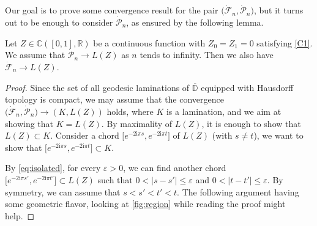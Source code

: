 \documentclass[10pt]{amsart}
\theoremstyle{definition}\newtheorem{defi}[theo]{Definition}\newtheorem{rema}[theo]{Remark}\newtheorem{exam}[theo]{Example}\newtheorem{exem}[theo]{Example}\newtheorem{nota}[theo]{Notation}
\newcommand{\R}{\mathbb{R}}
\newcommand{\D}{\mathbb{D}}
\def\dFn{\dot{\mathcal{F}}_{n}}
\def\dPn{\dot{\mathcal{P}}_{n}}
\renewcommand{\epsilon}{\varepsilon}
\begin{document}
Our goal is to prove some convergence result for the pair $\big(\dFn , \dPn  \big)$,
but it turns out to be enough to consider
 $ \dPn$, as ensured by the following lemma.

 \begin{lemma}
 \label{lem:reduction_FtoK}
  Let $Z \in {\mathbb{C}}([0, 1], \R)$ be a continuous function with $Z_{0}=Z_{1}=0$ satisfying \ref{C1}.
  We assume that $\dPn \rightarrow   L(Z)$ as $n$ tends to infinity.
Then we also have  $\dFn \rightarrow   L(Z)$.
 \end{lemma}
\begin{proof}
Since the set of all geodesic laminations of $\overline{\D}$ equipped with Hausdorff topology is compact, we may assume that the convergence $\big( \dFn, \dPn  \big)   \rightarrow   (K,L(Z))$ holds, where $K$ is a lamination, and we aim at showing that $K=L(Z)$. By maximality of $L(Z)$, it is enough to show that $L(Z) \subset K$.
Consider a chord  $\big[e^{-2\textrm{i} \pi s},e^{-2\textrm{i} \pi t}\big]$ of $L(Z)$ (with $s \neq t$),
we want to show that $\big[e^{-2\textrm{i} \pi s},e^{-2\textrm{i} \pi t}\big] \subset K$.

By \eqref{eq:isolated}, for every $\epsilon>0$, we can find another chord  $\big[e^{-2\textrm{i} \pi s'},e^{-2\textrm{i} \pi t'}\big] \subset L(Z)$ such that  $0<|s-s'| \leq \epsilon$ and $0<|t-t'| \leq \epsilon$.
By symmetry, we can assume that  $s<s'<t'<t$.
The following argument having some geometric flavor,
looking at \cref{fig:region} while reading the proof might help.


\end{proof}
\end{document}
